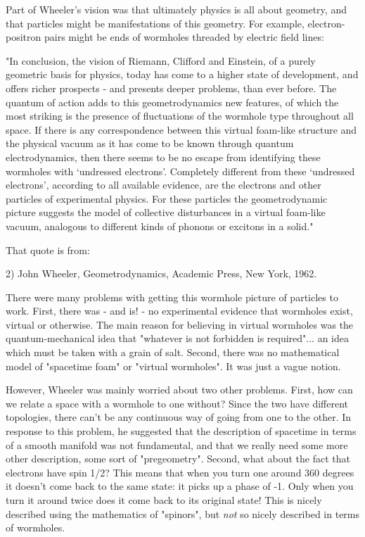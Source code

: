 Part of Wheeler's vision was that ultimately physics is all about
geometry, and that particles might be manifestations of this geometry.
For example, electron-positron pairs might be ends of wormholes threaded
by electric field lines:

"In conclusion, the vision of Riemann, Clifford and Einstein, of a
purely geometric basis for physics, today has come to a higher state of
development, and offers richer prospects - and presents deeper
problems, than ever before.  The quantum of action adds to this
geometrodynamics new features, of which the most striking is the
presence of fluctuations of the wormhole type throughout all space.  If
there is any correspondence between this virtual foam-like structure and
the physical vacuum as it has come to be known through quantum
electrodynamics, then there seems to be no escape from identifying these
wormholes with `undressed electrons'.  Completely different from these
`undressed electrons', according to all available evidence, are the
electrons and other particles of experimental physics.  For these
particles the geometrodynamic picture suggests the model of collective
disturbances in a virtual foam-like vacuum, analogous to different kinds
of phonons or excitons in a solid."

That quote is from:

2) John Wheeler, Geometrodynamics, Academic Press, New York, 1962.

There were many problems with getting this wormhole picture of particles
to work.  First, there was - and is! - no experimental evidence that
wormholes exist, virtual or otherwise.  The main reason for believing in
virtual wormholes was the quantum-mechanical idea that "whatever is not
forbidden is required"... an idea which must be taken with a grain of
salt.  Second, there was no mathematical model of "spacetime foam" or
"virtual wormholes".  It was just a vague notion.

However, Wheeler was mainly worried about two other problems.  First,
how can we relate a space with a wormhole to one without?  Since the two
have different topologies, there can't be any continuous way of going
from one to the other.  In response to this problem, he suggested that
the description of spacetime in terms of a smooth manifold was not
fundamental, and that we really need some more other description, some
sort of "pregeometry".  Second, what about the fact that electrons have
spin 1/2?  This means that when you turn one around 360 degrees it
doesn't come back to the same state: it picks up a phase of -1.  Only
when you turn it around twice does it come back to its original state!
This is nicely described using the mathematics of "spinors", but \emph{not} so
nicely described in terms of wormholes.

